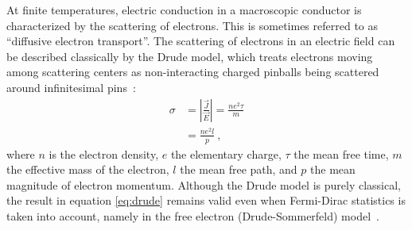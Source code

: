 At finite temperatures, electric conduction in a macroscopic conductor is characterized by the scattering of electrons. This is sometimes referred to as ``diffusive electron transport''. The scattering of electrons in an electric field can be described classically by the Drude model, which treats electrons moving among scattering centers as non-interacting charged pinballs being scattered around infinitesimal pins~\cite{drude1900a}:%
\begin{align}%
    \sigma &= \left|\frac{\vec{J}}{\vec{E}}\right| = \frac{ne^2\tau}{m}\\
        &= \frac{ne^2l}{p}~,\label{eq:drude}
\end{align}%
where $n$ is the electron density, $e$ the elementary charge, $\tau$ the mean free time, $m$ the effective mass of the electron, $l$ the mean free path, and $p$ the mean magnitude of electron momentum. Although the Drude model is purely classical, the result in equation \ref{eq:drude} remains valid even when Fermi-Dirac statistics is taken into account, namely in the free electron (Drude-Sommerfeld) model~\cite{sommerfeld1928}.

